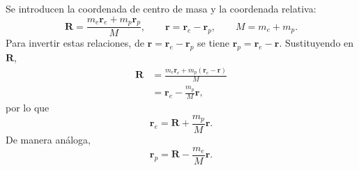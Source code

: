 \documentclass[11pt]{article}
\newcommand{\vb}[1]{\mathbf{#1}}
\begin{document}
Se introducen la coordenada de centro de masa y la coordenada relativa:
\begin{equation}
  \vb R
  =
  \frac{m_e\vb r_e+m_p\vb r_p}{M},
  \qquad
  \vb r
  =
  \vb r_e-\vb r_p,
  \qquad
  M=m_e+m_p.
\end{equation}
Para invertir estas relaciones, de \(\vb r=\vb r_e-\vb r_p\) se tiene
\(\vb r_p=\vb r_e-\vb r\). Sustituyendo en \(\vb R\),
\begin{align}
  \vb R
  &=
  \frac{m_e\vb r_e+m_p(\vb r_e-\vb r)}{M}                                      \\
  &=
  \vb r_e-\frac{m_p}{M}\vb r,
\end{align}
por lo que
\begin{equation}
  \vb r_e
  =
  \vb R+\frac{m_p}{M}\vb r.
\end{equation}
De manera an\'aloga,
\begin{equation}
  \vb r_p
  =
  \vb R-\frac{m_e}{M}\vb r.
\end{equation}
\end{document}
